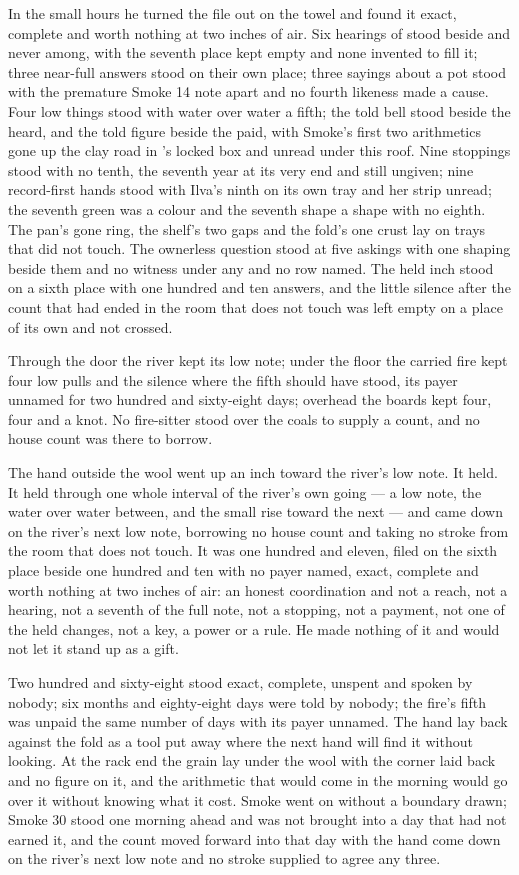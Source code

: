 In the small hours he turned the file out on the towel and found it exact, complete and worth nothing at two inches of air. Six hearings of  stood beside and never among, with the seventh place kept empty and none invented to fill it; three near-full answers stood on their own place; three sayings about a pot stood with the premature Smoke 14 note apart and no fourth likeness made a cause. Four low things stood with water over water a fifth; the told bell stood beside the heard, and the told figure beside the paid, with Smoke's first two arithmetics gone up the clay road in 's locked box and unread under this roof. Nine stoppings stood with no tenth, the seventh year at its very end and still ungiven; nine record-first hands stood with Ilva's ninth on its own tray and her strip unread; the seventh green was a colour and the seventh shape a shape with no eighth. The pan's gone ring, the shelf's two gaps and the fold's one crust lay on trays that did not touch. The ownerless question stood at five askings with one shaping beside them and no witness under any and no row named. The held inch stood on a sixth place with one hundred and ten answers, and the little silence after the count that had ended in the room that does not touch was left empty on a place of its own and not crossed.

Through the door the river kept its low note; under the floor the carried fire kept four low pulls and the silence where the fifth should have stood, its payer unnamed for two hundred and sixty-eight days; overhead the boards kept four, four and a knot. No fire-sitter stood over the coals to supply a count, and no house count was there to borrow.

The hand outside the wool went up an inch toward the river's low note. It held. It held through one whole interval of the river's own going --- a low note, the water over water between, and the small rise toward the next --- and came down on the river's next low note, borrowing no house count and taking no stroke from the room that does not touch. It was one hundred and eleven, filed on the sixth place beside one hundred and ten with no payer named, exact, complete and worth nothing at two inches of air: an honest coordination and not a reach, not a hearing, not a seventh of the full note, not a stopping, not a payment, not one of the held changes, not a key, a power or a rule. He made nothing of it and would not let it stand up as a gift.

Two hundred and sixty-eight stood exact, complete, unspent and spoken by nobody; six months and eighty-eight days were told by nobody; the fire's fifth was unpaid the same number of days with its payer unnamed. The hand lay back against the fold as a tool put away where the next hand will find it without looking. At the rack end the grain lay under the wool with the corner laid back and no figure on it, and the arithmetic that would come in the morning would go over it without knowing what it cost. Smoke went on without a boundary drawn; Smoke 30 stood one morning ahead and was not brought into a day that had not earned it, and the count moved forward into that day with the hand come down on the river's next low note and no stroke supplied to agree any three.
